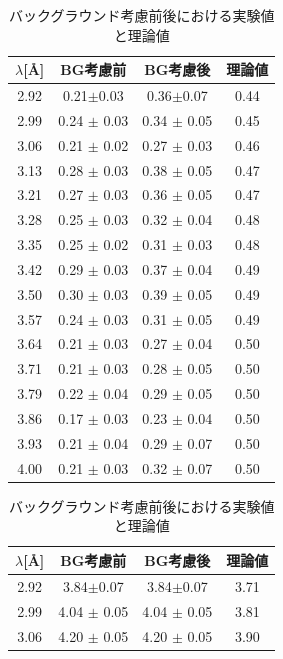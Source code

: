 \begin{table}[H]
\caption{バックグラウンド考慮前後における実験値と理論値}\label{Discussion2_tbl_ABCDb}
\begin{minipage}{0.5\hsize}
\centering
\begin{tabular}{cccc}
$\lambda$[\AA]&BG考慮前&BG考慮後&理論値\\ \hline
2.92&0.21$\pm$0.03&0.36$\pm$0.07&0.44\\
2.99 	&	0.24 	$\pm$	0.03 	&	0.34 	$\pm$	0.05 	&	0.45 	\\
3.06 	&	0.21 	$\pm$	0.02 	&	0.27 	$\pm$	0.03 	&	0.46 	\\
3.13 	&	0.28 	$\pm$	0.03 	&	0.38 	$\pm$	0.05 	&	0.47 	\\
3.21 	&	0.27 	$\pm$	0.03 	&	0.36 	$\pm$	0.05 	&	0.47 	\\
3.28 	&	0.25 	$\pm$	0.03 	&	0.32 	$\pm$	0.04 	&	0.48 	\\
3.35 	&	0.25 	$\pm$	0.02 	&	0.31 	$\pm$	0.03 	&	0.48 	\\
3.42 	&	0.29 	$\pm$	0.03 	&	0.37 	$\pm$	0.04 	&	0.49 	\\
3.50 	&	0.30 	$\pm$	0.03 	&	0.39 	$\pm$	0.05 	&	0.49 	\\
3.57 	&	0.24 	$\pm$	0.03 	&	0.31 	$\pm$	0.05 	&	0.49 	\\
3.64 	&	0.21 	$\pm$	0.03 	&	0.27 	$\pm$	0.04 	&	0.50 	\\
3.71 	&	0.21 	$\pm$	0.03 	&	0.28 	$\pm$	0.05 	&	0.50 	\\
3.79 	&	0.22 	$\pm$	0.04 	&	0.29 	$\pm$	0.05 	&	0.50 	\\
3.86 	&	0.17 	$\pm$	0.03 	&	0.23 	$\pm$	0.04 	&	0.50 	\\
3.93 	&	0.21 	$\pm$	0.04 	&	0.29 	$\pm$	0.07 	&	0.50 	\\
4.00 	&	0.21 	$\pm$	0.03 	&	0.32 	$\pm$	0.07 	&	0.50	\\ \hline
\end{tabular}
\vspace{5mm}
\end{minipage}
\begin{minipage}{0.5\hsize}
\centering
\begin{tabular}{cccc}
$\lambda$[\AA]&BG考慮前&BG考慮後&理論値\\ \hline
2.92&3.84$\pm$0.07&3.84$\pm$0.07&3.71\\
2.99 	&	4.04 	$\pm$	0.05 	&	4.04 	$\pm$	0.05 	&	3.81 	\\
3.06 	&	4.20 	$\pm$	0.05 	&	4.20 	$\pm$	0.05 	&	3.90 	\\

\end{tabular}
\end{minipage}
\end{table}
